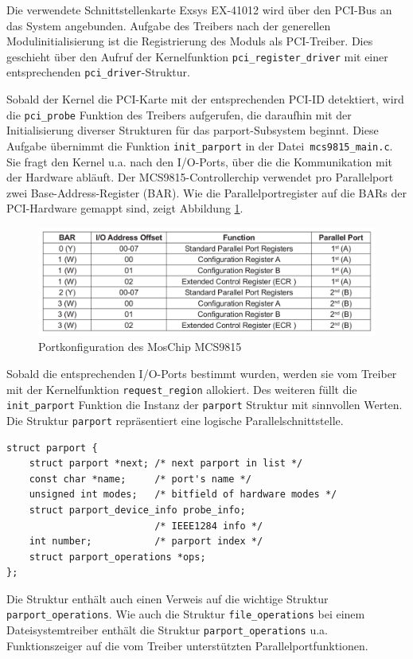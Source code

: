 \documentclass[a4paper,11pt]{article}
\begin{document}
Die verwendete Schnittstellenkarte Exsys EX-41012 wird über den PCI-Bus an das System angebunden. Aufgabe des Treibers nach der generellen
Modulinitialisierung ist die Registrierung des Moduls als PCI-Treiber. Dies geschieht über den Aufruf der Kernelfunktion
\verb|pci_register_driver| mit einer entsprechenden \verb|pci_driver|-Struktur.

Sobald der Kernel die PCI-Karte mit der entsprechenden PCI-ID detektiert, wird die \verb|pci_probe| Funktion des Treibers aufgerufen, die
daraufhin mit der Initialisierung diverser Strukturen für das parport-Subsystem beginnt. Diese Aufgabe übernimmt die Funktion \verb|init_parport|
in der Datei\verb| mcs9815_main.c|.
Sie fragt den Kernel u.a. nach den I/O-Ports, über die die Kommunikation mit der Hardware abläuft. Der MCS9815-Controllerchip verwendet pro
Parallelport zwei Base-Address-Register (BAR). Wie die Parallelportregister auf die BARs der PCI-Hardware gemappt sind, zeigt 
Abbildung \ref{portkonf_mcs9815}.

\begin{figure}[h!]
 \centering
 \includegraphics[scale=0.5]{./pics/mcs9815_ioports.png}
 \caption{Portkonfiguration des MosChip MCS9815}
 \label{portkonf_mcs9815}
\end{figure}

\newpage 
\noindent
Sobald die entsprechenden I/O-Ports bestimmt wurden, werden sie vom Treiber mit der Kernelfunktion \verb|request_region| allokiert.
Des weiteren füllt die \verb|init_parport| Funktion die Instanz der \verb|parport| Struktur mit sinnvollen Werten.
Die Struktur \verb|parport| repräsentiert eine logische Parallelschnittstelle.

\begin{verbatim}
struct parport {
    struct parport *next; /* next parport in list */
    const char *name;     /* port's name */
    unsigned int modes;   /* bitfield of hardware modes */
    struct parport_device_info probe_info;
                          /* IEEE1284 info */
    int number;           /* parport index */
    struct parport_operations *ops;
};\end{verbatim}
\noindent
Die Struktur enthält auch einen Verweis auf die wichtige Struktur \verb|parport_operations|.
Wie auch die Struktur \verb|file_operations| bei einem Dateisystemtreiber enthält die 
Struktur \verb|parport_operations| u.a. Funktionszeiger auf die vom Treiber unterstützten
Parallelportfunktionen.
\end{document}
